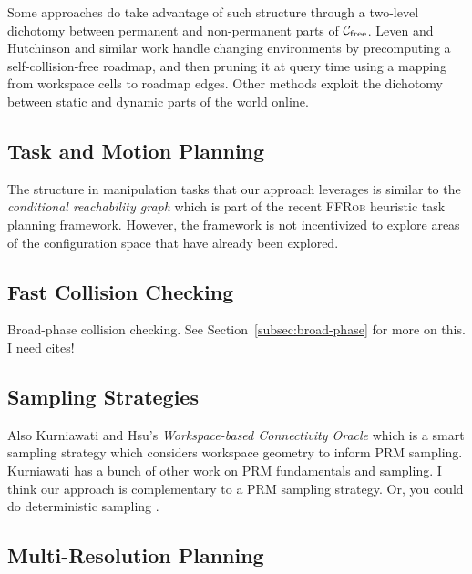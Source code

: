 \documentclass{report}
\begin{document}
Some approaches do take advantage of such structure
through a two-level dichotomy between
permanent and non-permanent parts of
$\mathcal{C}_{\mbox{\scriptsize free}}$.
Leven and Hutchinson \cite{leven2000changing}
and similar work \cite{kallman2004dynamicroadmaps}
handle changing environments by
precomputing a self-collision-free roadmap,
and then pruning it at query time
using a mapping from workspace cells to roadmap edges.
Other methods \cite{jaillet2004dynamicprm}
exploit the dichotomy between static and dynamic parts of
the world online.

\subsection{Task and Motion Planning}

The structure in manipulation tasks that our approach leverages
is similar to the \emph{conditional reachability graph} which is
part of the recent \textsc{FFRob} heuristic task planning framework.
However, the framework is not incentivized to explore
areas of the configuration space that have already been explored.

\subsection{Fast Collision Checking}

Broad-phase collision checking.
See Section~\ref{subsec:broad-phase} for more on this.
I need cites!

\subsection{Sampling Strategies}

Also Kurniawati and Hsu's
\emph{Workspace-based Connectivity Oracle}
\cite{kurniawati2008workconnoracle}
which is a smart sampling strategy which considers workspace
geometry to inform PRM sampling.
Kurniawati has a bunch of other work on PRM fundamentals and sampling.
I think our approach is complementary to a PRM sampling strategy.
Or, you could do deterministic sampling
\cite{lavalle2002gridprms} \cite{geraerts2002prmcomparison}.

\subsection{Multi-Resolution Planning}
\end{document}

